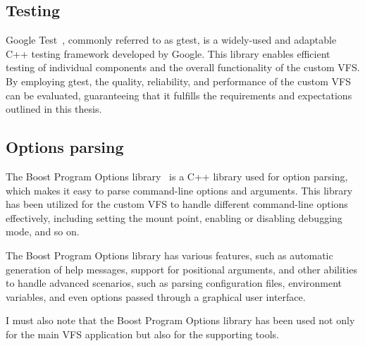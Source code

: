 \subsection{Testing}\label{subsec:gtest}

Google Test~\cite{google_test}, commonly referred to as gtest, is a widely-used and adaptable C++ testing framework developed by Google.
This library enables efficient testing of individual components and the overall functionality of the custom VFS\@.
By employing gtest, the quality, reliability, and performance of the custom VFS can be evaluated, guaranteeing that it fulfills the requirements and expectations outlined in this thesis.

\subsection{Options parsing}\label{subsec:options-parsing}

The Boost Program Options library~\cite{boost_program_options} is a C++ library used for option parsing, which makes it easy to parse command-line options and arguments.
This library has been utilized for the custom VFS to handle different command-line options effectively, including setting the mount point, enabling or disabling debugging mode, and so on.

The Boost Program Options library has various features, such as automatic generation of help messages, support for positional arguments, and other abilities to handle advanced scenarios, such as parsing configuration files, environment variables, and even options passed through a graphical user interface.

I must also note that the Boost Program Options library has been used not only for the main VFS application but also for the supporting tools.